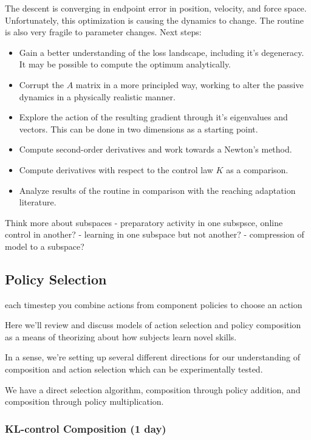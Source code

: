 \documentclass[
  a4paper,
]{article}
\providecommand{\tightlist}{%
  \setlength{\itemsep}{0pt}\setlength{\parskip}{0pt}}
\begin{document}
The descent is converging in endpoint error in position, velocity, and
force space. Unfortunately, this optimization is causing the dynamics to
change. The routine is also very fragile to parameter changes. Next
steps:

\begin{itemize}
\tightlist
\item
  Gain a better understanding of the loss landscape, including it's
  degeneracy. It may be possible to compute the optimum analytically.
\item
  Corrupt the \(A\) matrix in a more principled way, working to alter
  the passive dynamics in a physically realistic manner.
\item
  Explore the action of the resulting gradient through it's eigenvalues
  and vectors. This can be done in two dimensions as a starting point.
\item
  Compute second-order derivatives and work towards a Newton's method.
\item
  Compute derivatives with respect to the control law \(K\) as a
  comparison.
\item
  Analyze results of the routine in comparison with the reaching
  adaptation literature.
\end{itemize}

Think more about subspaces - preparatory activity in one subspsce,
online control in another? - learning in one subspace but not another? -
compression of model to a subspace?

\hypertarget{policy-selection}{%
\subsection{Policy Selection}\label{policy-selection}}

each timestep you combine actions from component policies to choose an
action

Here we'll review and discuss models of action selection and policy
composition as a means of theorizing about how subjects learn novel
skills.

In a sense, we're setting up several different directions for our
understanding of composition and action selection which can be
experimentally tested.

We have a direct selection algorithm, composition through policy
addition, and composition through policy multiplication.

\hypertarget{kl-control-composition-1-day}{%
\subsubsection{KL-control Composition (1
day)}\label{kl-control-composition-1-day}}
\end{document}
